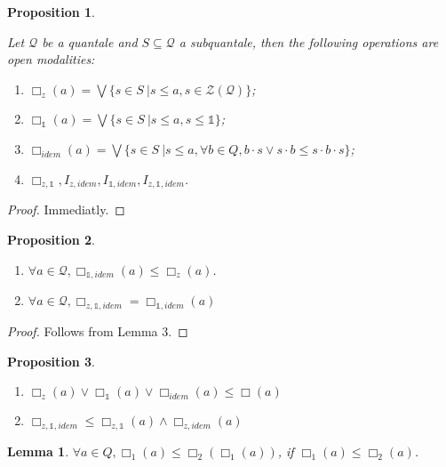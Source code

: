 \documentclass[a4paper]{article}
\newtheorem{prop}{Proposition}
\newtheorem{lemma}{Lemma}
\begin{document}
\begin{prop}
$ $

Let $\mathcal{Q}$ be a quantale and $S \subseteq \mathcal{Q}$ a subquantale, then the following operations are open modalities:

\begin{enumerate}
  \item $\Box_z (a) = \bigvee \{ s \in S \: | s \leq a, s \in \mathcal{Z}(\mathcal{Q}) \}$;
  \item $\Box_{\mathds{1}} (a) = \bigvee \{ s \in S \: | s \leq a, s \leq \mathds{1} \}$;
  \item $\Box_{idem} (a) = \bigvee \{ s \in S \: | s \leq a, \forall b \in Q, b \cdot s \vee s \cdot b \leq s \cdot b \cdot s\}$;
  \item $\Box_{z, \mathds{1}}, I_{z, idem}, I_{\mathds{1}, idem}, I_{z, \mathds{1}, idem}$.
\end{enumerate}
\end{prop}

\begin{proof}
  Immediatly.
\end{proof}

\begin{prop}
$ $

\begin{enumerate}
  \item $\forall a \in \mathcal{Q}, \Box_{\mathds{1}, idem}(a) \leq \Box_z (a)$.
  \item $\forall a \in \mathcal{Q}, \Box_{z, \mathds{1}, idem} = \Box_{\mathds{1}, idem}(a)$
\end{enumerate}

\end{prop}

\begin{proof}
  Follows from Lemma 3.
\end{proof}

\begin{prop}
$ $

\begin{enumerate}
  \item $\Box_z (a) \vee \Box_{\mathds{1}} (a) \vee \Box_{idem} (a) \leq \Box(a)$
  \item $\Box_{z, \mathds{1}, idem} \leq \Box_{z, \mathds{1}} (a) \wedge \Box_{z, idem} (a)$
\end{enumerate}
\end{prop}

\begin{lemma}
  $\forall a \in Q, \Box_1 (a) \leq \Box_2 (\Box_1 (a))$, if $\Box_1 (a) \leq \Box_2 (a)$.
\end{lemma}
\end{document}
